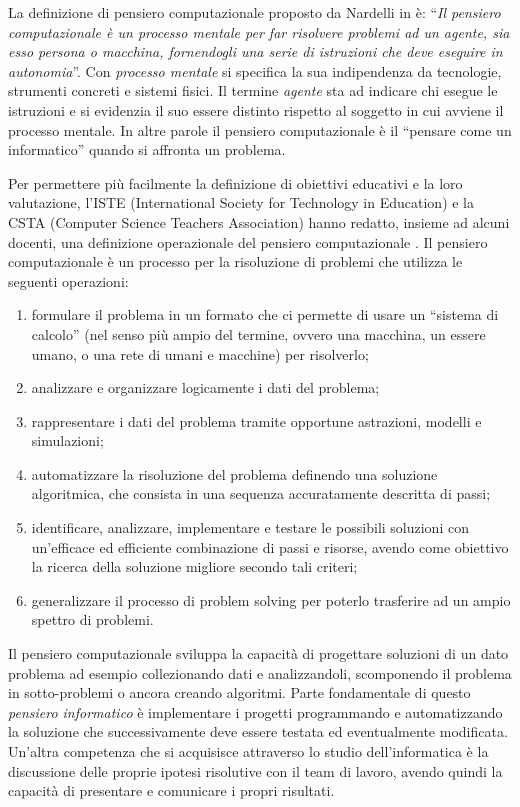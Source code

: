 \documentclass[12pt]{report}
\begin{document}
La definizione di pensiero computazionale proposto da Nardelli in \cite{NardelliCT} è:
``\textit{Il pensiero computazionale è un processo mentale per far risolvere problemi ad un agente, sia esso persona o macchina, fornendogli una serie di istruzioni che deve eseguire in autonomia}''.
Con \textit{processo mentale} si specifica la sua indipendenza da tecnologie, strumenti concreti e sistemi fisici. Il termine \textit{agente} sta ad indicare chi esegue le istruzioni e si evidenzia il suo essere distinto rispetto al soggetto in cui avviene il processo mentale.
In altre parole il pensiero computazionale è il ``pensare come un informatico'' quando si affronta un problema.


Per permettere più facilmente la definizione di obiettivi educativi e la loro valutazione, l'ISTE (International Society for Technology in Education) e la CSTA (Computer Science Teachers Association) hanno redatto, insieme ad alcuni docenti, una definizione operazionale del pensiero computazionale \cite{flayerCT}. Il pensiero computazionale è un processo per la risoluzione di problemi che utilizza le seguenti operazioni:
\begin{enumerate}[label=(\alph*)]
	\item formulare il problema in un formato che ci permette di usare un ``sistema di calcolo'' (nel senso più ampio del termine, ovvero una macchina, un essere umano, o una rete di umani e macchine) per risolverlo;
	\item analizzare e organizzare logicamente i dati del problema;
	\item rappresentare i dati del problema tramite opportune astrazioni, modelli e simulazioni;
	\item automatizzare la risoluzione del problema definendo una soluzione algoritmica, che consista in una sequenza accuratamente descritta di passi;
	\item identificare, analizzare, implementare e testare le possibili soluzioni con un'efficace ed efficiente combinazione di passi e risorse, avendo come obiettivo la ricerca della soluzione migliore secondo tali criteri;
	\item generalizzare il processo di problem solving per poterlo trasferire ad un ampio spettro di problemi.
\end{enumerate}

Il pensiero computazionale sviluppa la capacità di progettare soluzioni di un dato problema ad esempio collezionando dati e analizzandoli, scomponendo il problema in sotto-problemi o ancora creando algoritmi.
Parte fondamentale di questo \textit{pensiero informatico} è implementare i progetti programmando e automatizzando la soluzione che successivamente deve essere testata ed eventualmente modificata. Un'altra competenza che si acquisisce attraverso lo studio dell'informatica è la discussione delle proprie ipotesi risolutive con il team di lavoro, avendo quindi la capacità di presentare e comunicare i propri risultati.
\end{document}
